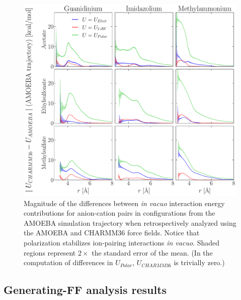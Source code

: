 \documentclass[journal=jacsat,articletitle=true,manuscript=suppinfo,layout=onecolumn]{achemso}
\begin{document}
    \begin{figure}[H]
    \begin{center}
        \includegraphics[width=1\columnwidth]{images/cross_ff_analysis_energy_cont_diff.pdf}
        \caption{Magnitude of the differences between \emph{in vacuo} interaction energy contributions for anion-cation pairs in configurations from the AMOEBA simulation trajectory when retrospectively analyzed using the AMOEBA and CHARMM36 force fields. Notice that polarization stabilizes ion-pairing interactions \emph{in vacuo}. Shaded regions represent $2\times$ the standard error of the mean. (In the computation of differences in $U_{Polar}$, $U_{CHARMM36}$ is trivially zero.) }
        \label{fig:cross_ff_diff}
    \end{center}
    \end{figure}




    \subsection{Generating-FF analysis results}
\end{document}
